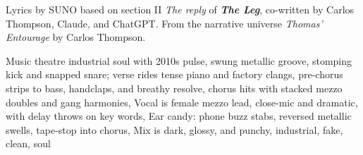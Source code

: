 
\begin{notes}
Lyrics by SUNO based on section II \emph{The reply} of \emph{\bfseries The Leg}, %
co-written by Carlos Thompson, Claude, and ChatGPT. %
From the narrative universe \emph{Thomas’ Entourage} by Carlos Thompson.
\end{notes}
\begin{style}
Music theatre industrial soul with 2010s pulse, swung metallic groove, stomping kick and snapped snare; verse rides tense piano and factory clangs, pre-chorus strips to bass, handclaps, and breathy resolve, chorus hits with stacked mezzo doubles and gang harmonies, Vocal is female mezzo lead, close-mic and dramatic, with delay throws on key words, Ear candy: phone buzz stabs, reversed metallic swells, tape-stop into chorus, Mix is dark, glossy, and punchy, industrial, fake, clean, soul
\end{style}
